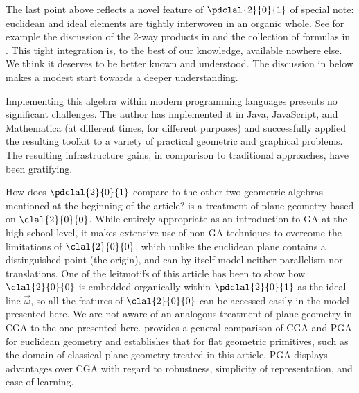 \documentclass[12pt]{article}
\begin{document}
The last point above reflects a novel feature of $\pdclal{2}{0}{1}$ of special note: euclidean and ideal elements are tightly interwoven in an organic whole.  See for example the discussion of the 2-way products in  and the collection of formulas in . This tight integration is, to the best of our knowledge, available nowhere else.  We think it deserves to be better known and understood.  The discussion in   below makes a modest start towards a deeper  understanding.

Implementing this algebra within modern programming languages presents no significant challenges.  The author has implemented it in Java, JavaScript, and Mathematica (at different times, for different purposes) and  successfully applied the resulting toolkit to a variety of practical geometric and graphical problems. The resulting infrastructure gains, in comparison to traditional approaches, have been gratifying.

How does  $\pdclal{2}{0}{1}$ compare to the other two geometric algebras mentioned at the beginning of the article?  \cite{calvet2007} is a treatment of plane geometry based on $\clal{2}{0}{0}$.  While entirely appropriate as an introduction to GA at the high school level, it  makes extensive use of non-GA techniques to overcome the limitations of $\clal{2}{0}{0}$, which unlike the euclidean plane contains a distinguished point (the origin), and can by itself model neither parallelism nor translations.  One of the leitmotifs of this article has been to show how $\clal{2}{0}{0}$ is embedded organically within  $\pdclal{2}{0}{1}$ as the ideal line $ \vec{\omega}$, so all the features of $\clal{2}{0}{0}$ can be accessed easily in the model presented here.
We are not aware of an analogous treatment of plane geometry in CGA to the one presented here.  \cite{gunn2016} provides a general comparison of CGA and PGA for euclidean geometry and establishes that for flat geometric primitives, such as the domain of classical plane geometry treated in this article, PGA displays advantages over CGA with regard to robustness, simplicity of representation, and ease of learning.
\end{document}
